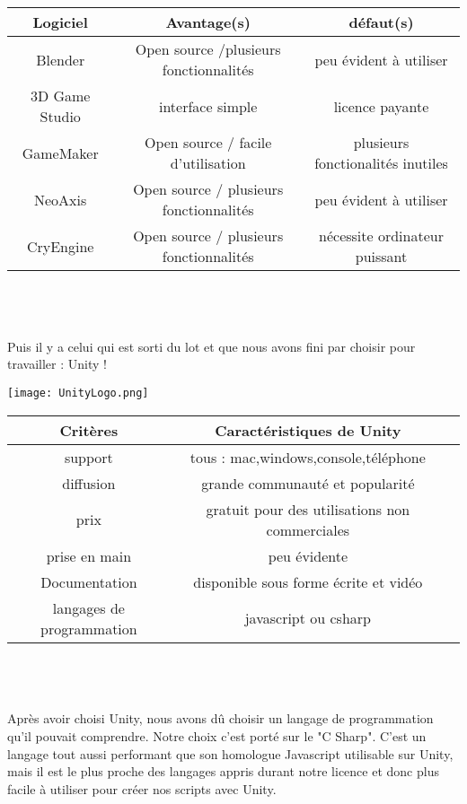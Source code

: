 \documentclass[12pt,a4paper,article]{article} %
\begin{document}
\noindent
\begin{tabular}{|c|c|c|}
  \hline
  Logiciel & Avantage(s) & défaut(s) \\
  \hline
  Blender & Open source /plusieurs fonctionnalités & peu évident à utiliser\\
  \hline
  3D Game Studio & interface simple & licence payante  \\
  \hline
  GameMaker  & Open source / facile d'utilisation & plusieurs fonctionalités inutiles \\
  \hline
  NeoAxis & Open source / plusieurs fonctionnalités & peu évident à utiliser \\
  \hline
  CryEngine & Open source / plusieurs fonctionnalités & nécessite ordinateur puissant \\
  \hline
 
\end{tabular}\\
\\
\\Puis il y a celui qui est sorti du lot et que nous avons fini par choisir pour travailler : Unity !

\begin{center}
\texttt{[image: UnityLogo.png]}
\end{center}


\noindent
\begin{tabular}{|c|c|c|}
  \hline
  Critères & Caractéristiques de Unity \\
  \hline
  support & tous : mac,windows,console,téléphone\\
  \hline
  diffusion & grande communauté et popularité \\
  \hline
  prix & gratuit pour des utilisations non commerciales\\
  \hline
  prise en main& peu évidente \\\hline
  Documentation &  disponible sous forme écrite et vidéo\\
  \hline
  langages de programmation &javascript ou csharp\\
  \hline
 

\end{tabular}\\
\\
\\Après avoir choisi Unity, nous avons d\^u choisir un langage de programmation qu'il pouvait comprendre. Notre choix c'est porté sur le "C Sharp". C'est un langage tout aussi performant que son homologue Javascript utilisable sur Unity, mais il est le plus proche des langages appris durant notre licence et donc plus facile à utiliser pour créer nos scripts avec Unity.
\end{document}
